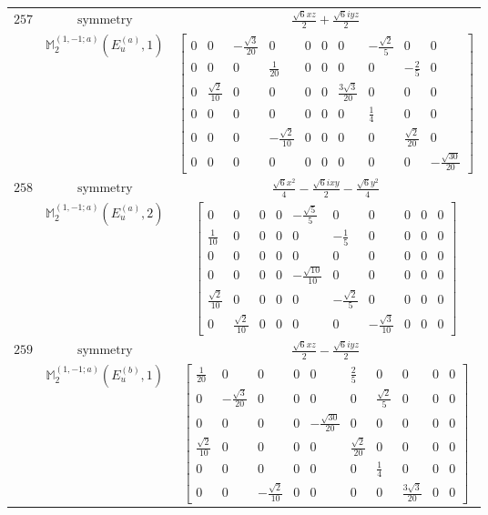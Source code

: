 \documentclass[fleqn,8pt,landscape]{jsarticle}
\begin{document}
\begin{longtable}{ccc}
$ 257 $ & $ \text{symmetry} $ & $ \frac{\sqrt{6} x z}{2} + \frac{\sqrt{6} i y z}{2} $ \\
$  $ & $ \mathbb{M}_{2}^{(1,-1;a)}(E_{u}^{(a)},1) $ & $ \begin{bmatrix} 0 & 0 & - \frac{\sqrt{3}}{20} & 0 & 0 & 0 & 0 & - \frac{\sqrt{2}}{5} & 0 & 0 \\ 0 & 0 & 0 & \frac{1}{20} & 0 & 0 & 0 & 0 & - \frac{2}{5} & 0 \\ 0 & \frac{\sqrt{2}}{10} & 0 & 0 & 0 & 0 & \frac{3 \sqrt{3}}{20} & 0 & 0 & 0 \\ 0 & 0 & 0 & 0 & 0 & 0 & 0 & \frac{1}{4} & 0 & 0 \\ 0 & 0 & 0 & - \frac{\sqrt{2}}{10} & 0 & 0 & 0 & 0 & \frac{\sqrt{2}}{20} & 0 \\ 0 & 0 & 0 & 0 & 0 & 0 & 0 & 0 & 0 & - \frac{\sqrt{30}}{20} \end{bmatrix} $ \\ \hline
$ 258 $ & $ \text{symmetry} $ & $ \frac{\sqrt{6} x^{2}}{4} - \frac{\sqrt{6} i x y}{2} - \frac{\sqrt{6} y^{2}}{4} $ \\
$  $ & $ \mathbb{M}_{2}^{(1,-1;a)}(E_{u}^{(a)},2) $ & $ \begin{bmatrix} 0 & 0 & 0 & 0 & - \frac{\sqrt{5}}{5} & 0 & 0 & 0 & 0 & 0 \\ \frac{1}{10} & 0 & 0 & 0 & 0 & - \frac{1}{5} & 0 & 0 & 0 & 0 \\ 0 & 0 & 0 & 0 & 0 & 0 & 0 & 0 & 0 & 0 \\ 0 & 0 & 0 & 0 & - \frac{\sqrt{10}}{10} & 0 & 0 & 0 & 0 & 0 \\ \frac{\sqrt{2}}{10} & 0 & 0 & 0 & 0 & - \frac{\sqrt{2}}{5} & 0 & 0 & 0 & 0 \\ 0 & \frac{\sqrt{2}}{10} & 0 & 0 & 0 & 0 & - \frac{\sqrt{3}}{10} & 0 & 0 & 0 \end{bmatrix} $ \\ \hline
$ 259 $ & $ \text{symmetry} $ & $ \frac{\sqrt{6} x z}{2} - \frac{\sqrt{6} i y z}{2} $ \\
$  $ & $ \mathbb{M}_{2}^{(1,-1;a)}(E_{u}^{(b)},1) $ & $ \begin{bmatrix} \frac{1}{20} & 0 & 0 & 0 & 0 & \frac{2}{5} & 0 & 0 & 0 & 0 \\ 0 & - \frac{\sqrt{3}}{20} & 0 & 0 & 0 & 0 & \frac{\sqrt{2}}{5} & 0 & 0 & 0 \\ 0 & 0 & 0 & 0 & - \frac{\sqrt{30}}{20} & 0 & 0 & 0 & 0 & 0 \\ \frac{\sqrt{2}}{10} & 0 & 0 & 0 & 0 & \frac{\sqrt{2}}{20} & 0 & 0 & 0 & 0 \\ 0 & 0 & 0 & 0 & 0 & 0 & \frac{1}{4} & 0 & 0 & 0 \\ 0 & 0 & - \frac{\sqrt{2}}{10} & 0 & 0 & 0 & 0 & \frac{3 \sqrt{3}}{20} & 0 & 0 \end{bmatrix} $ \\ \hline

\end{longtable}
\end{document}
